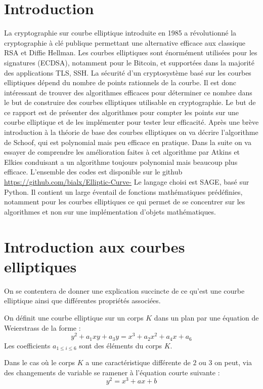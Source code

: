 \documentclass[12pt]{article}
\begin{document}
\section{Introduction}
La cryptographie sur courbe elliptique introduite en 1985 a révolutionné la cryptographie à clé publique permettant une alternative efficace aux classique RSA et Diffie Hellman. Les courbes elliptiques sont énormément utilisées pour les signatures (ECDSA), notamment pour le Bitcoin, et supportées dans la majorité des applications TLS, SSH. La sécurité d'un cryptosystème basé sur les courbes elliptiques dépend du nombre de points rationnels de la courbe. Il est donc intéressant de trouver des algorithmes efficaces pour déterminer ce nombre dans le but de construire des courbes elliptiques utilisable en cryptographie.
Le but de ce rapport est de présenter des algorithmes pour compter les points sur une courbe elliptique et de les implémenter pour tester leur efficacité. Après une brève introduction à la théorie de base des courbes elliptiques on va décrire l'algorithme de Schoof, qui est polynomial mais peu efficace en pratique. Dans la suite on va essayer de comprendre les amélioration faites à cet algorithme par Atkins et Elkies conduisant a un algorithme toujours polynomial mais beaucoup plus efficace.
\newline
L'ensemble des codes est disponible sur le github \url{https://github.com/bialx/Elliptic-Curve-} Le langage choisi est SAGE, basé sur Python. Il contient un large éventail de fonctions mathématiques prédéfinies, notamment pour les courbes elliptiques ce qui permet de se concentrer sur les algorithmes et non sur une implémentation d'objets mathématiques.
\section{Introduction aux courbes elliptiques}
 On se contentera de donner une explication succincte de ce qu'est une courbe elliptique ainsi que différentes propriétés associées.

\begin{defi}
On définit une courbe elliptique sur un corps $K$ dans un plan par une équation de Weierstrass de la forme : 
\begin{equation*}
y^2 + a_1xy + a_3y  = x^3 + a_2x^2 + a_4x + a_6
\end{equation*}
Les coefficients $a_{1 \leq i \leq 6}$ sont des éléments du corps $K$.
\end{defi}

Dans le cas où le corps $K$ a une caractéristique différente de $2$ ou $3$ on peut, via des changements de variable se ramener à l'équation courte suivante : 
\begin{equation*}
y^2 = x^3 + ax +b
\end{equation*}
\end{document}
